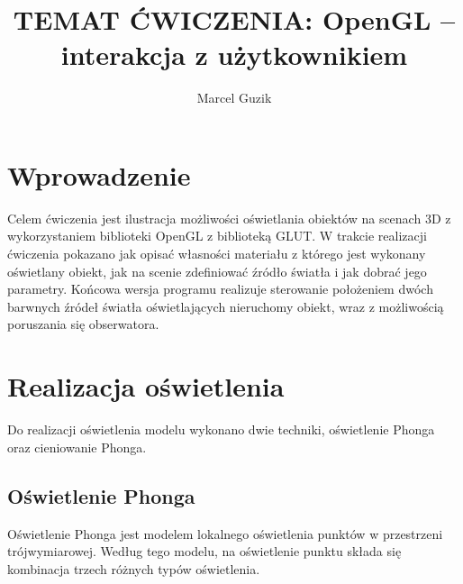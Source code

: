 \documentclass[a4paper]{article}
\title{TEMAT ĆWICZENIA: OpenGL – interakcja z użytkownikiem}
\author{Marcel Guzik}
\begin{document}
\section{Wprowadzenie}

Celem ćwiczenia jest ilustracja możliwości oświetlania obiektów na scenach 3D z
wykorzystaniem biblioteki OpenGL z biblioteką GLUT. W trakcie realizacji
ćwiczenia pokazano jak opisać własności materiału z którego jest wykonany
oświetlany obiekt, jak na scenie zdefiniować źródło światła i jak dobrać jego
parametry. Końcowa wersja programu realizuje sterowanie położeniem dwóch
barwnych źródeł światła oświetlających nieruchomy obiekt, wraz z możliwością
poruszania się obserwatora.


\section{Realizacja oświetlenia}

Do realizacji oświetlenia modelu wykonano dwie techniki, oświetlenie Phonga oraz
cieniowanie Phonga.

\subsection{Oświetlenie Phonga}

Oświetlenie Phonga jest modelem lokalnego oświetlenia punktów w przestrzeni
trójwymiarowej. Według tego modelu, na oświetlenie punktu składa się kombinacja
trzech różnych typów oświetlenia.
\end{document}
